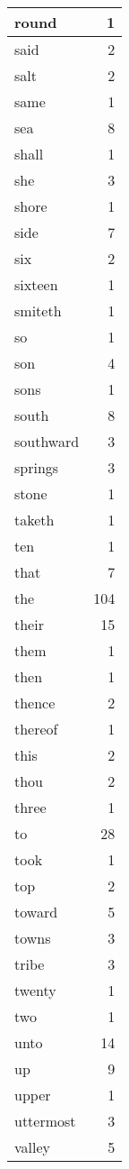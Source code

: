 \begin{center}
\begin{longtable}{l|r}
round & 1\\ \hline 
said & 2\\ \hline 
salt & 2\\ \hline 
same & 1\\ \hline 
sea & 8\\ \hline 
shall & 1\\ \hline 
she & 3\\ \hline 
shore & 1\\ \hline 
side & 7\\ \hline 
six & 2\\ \hline 
sixteen & 1\\ \hline 
smiteth & 1\\ \hline 
so & 1\\ \hline 
son & 4\\ \hline 
sons & 1\\ \hline 
south & 8\\ \hline 
southward & 3\\ \hline 
springs & 3\\ \hline 
stone & 1\\ \hline 
taketh & 1\\ \hline 
ten & 1\\ \hline 
that & 7\\ \hline 
the & 104\\ \hline 
their & 15\\ \hline 
them & 1\\ \hline 
then & 1\\ \hline 
thence & 2\\ \hline 
thereof & 1\\ \hline 
this & 2\\ \hline 
thou & 2\\ \hline 
three & 1\\ \hline 
to & 28\\ \hline 
took & 1\\ \hline 
top & 2\\ \hline 
toward & 5\\ \hline 
towns & 3\\ \hline 
tribe & 3\\ \hline 
twenty & 1\\ \hline 
two & 1\\ \hline 
unto & 14\\ \hline 
up & 9\\ \hline 
upper & 1\\ \hline 
uttermost & 3\\ \hline 
valley & 5\\ \hline 

\end{longtable}
\end{center}
